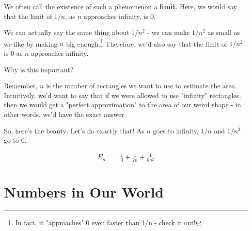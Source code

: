 \documentclass{article}
\begin{document}
We often call the existence of such a phenomenon a \textbf{limit}. Here, we would say that the limit of $1/n$, as $n$ approaches infinity, is 0. 

We can actually say the same thing about $1/n^2$ - we can make $1/n^2$ as small as we like by making $n$ big enough.\footnote{In fact, it "approaches" 0 even faster than 1/n - check it out!} Therefore, we'd also say that the limit of $1/n^2$ is 0 as $n$ approaches infinity.

Why is this important?


Remember, $n$ is the number of rectangles we want to use to estimate the area. Intuitively, we'd want to say that if we were allowed to use "infinity" rectangles, then we would get a "perfect approximation" to the area of our weird shape - in other words, we'd have the exact answer. 

So, here's the beauty: Let's do exactly that! As $n$ goes to infinity, $1/n$ and $1/n^2$ go to 0. 




\begin{align*}
E_n &= \frac{1}{3} + \frac{1}{2n} + \frac{1}{6n^2}
\end{align*}














\section{Numbers in Our World}
\end{document}
